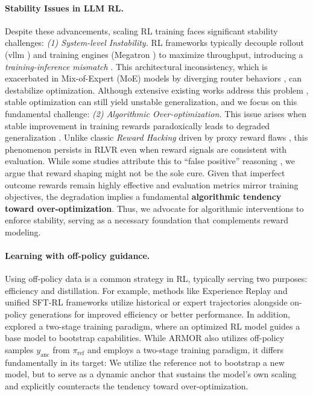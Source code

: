 \paragraph{Stability Issues in LLM RL.}
Despite these advancements, scaling RL training faces significant stability challenges:
\textit{(1) System-level Instability.} 
RL frameworks typically decouple rollout (\eg vllm \citep{vllm}) and training engines (\eg Megatron \citep{megatron-lm}) to maximize throughput, introducing a \textit{training-inference mismatch} \citep{TIS, SpeedStability}.
This architectural inconsistency, which is exacerbated in Mix-of-Expert (MoE) models by diverging router behaviors \citep{GSPO}, can destabilize optimization.
Although extensive existing works address this problem \citep{IcePop, XiaomiR3, MiniRL}, stable optimization can still yield unstable generalization, and we focus on this fundamental challenge:
\textit{(2) Algorithmic Over-optimization.}
This issue arises when stable improvement in training rewards paradoxically leads to degraded generalization \citep{gao2023scaling, repo}.
Unlike classic \textit{Reward Hacking} driven by proxy reward flaws \citep{weng2024rewardhack}, this phenomenon persists in RLVR even when reward signals are consistent with evaluation.
While some studies attribute this to ``false positive'' reasoning \citep{why-hallucinate, ding2025fapo}, we argue that reward shaping might not be the sole cure.
Given that imperfect outcome rewards remain highly effective \citep{ding2025fapo} and evaluation metrics mirror training objectives, the degradation implies a fundamental \textbf{algorithmic tendency toward over-optimization}.
Thus, we advocate for algorithmic interventions to enforce stability, serving as a necessary foundation that complements reward modeling.

\paragraph{Learning with off-policy guidance.}
Using off-policy data is a common strategy in RL, typically serving two purposes: efficiency and distillation.
For example, methods like Experience Replay \citep{repo_replay, remix, exgrpo} and unified SFT-RL frameworks \citep{luffy, upt, mentor} utilize historical or expert trajectories alongside on-policy generations for improved efficiency or better performance.
In addition, \citet{rlep} explored a two-stage training paradigm, where an optimized RL model guides a base model to bootstrap capabilities.
While ARMOR also utilizes off-policy samples $y_\text{anc}$ from $\pi_\text{ref}$ and employs a two-stage training paradigm, it differs fundamentally in its target:
We utilize the reference not to bootstrap a new model, but to serve as a dynamic anchor that sustains the model's own scaling and explicitly counteracts the tendency toward over-optimization.\\

